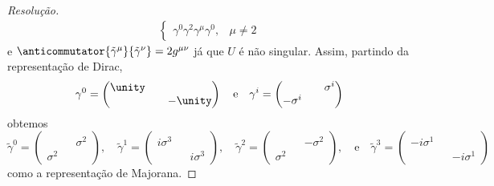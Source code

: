 \begin{proof}[Resolução]
\begin{align*}
\begin{cases}
                               \gamma^0 \gamma^2 \gamma^\mu\gamma^0,&\mu \neq 2
                           \end{cases}
    \end{align*}
    e \(\anticommutator{\tilde{\gamma}^\mu}{\tilde{\gamma}^\nu} = 2g^{\mu\nu}\) já que \(U\) é não singular. Assim, partindo da representação de Dirac,
    \begin{equation*}
        \gamma^0 = \begin{pmatrix}
            \unity &&\\
                   && -\unity
        \end{pmatrix}
        \quad\text{e}\quad
        \gamma^i = \begin{pmatrix}
            && \sigma^i\\
            -\sigma^i &&
        \end{pmatrix}
    \end{equation*}
    obtemos
    \begin{equation*}
        \tilde{\gamma}^0 
        = \begin{pmatrix}
            && \sigma^2\\
            \sigma^2 &&
        \end{pmatrix},\quad
        \tilde{\gamma}^1 
        = \begin{pmatrix}
            i \sigma^3 && \\
            && i \sigma^3
        \end{pmatrix},\quad
        \tilde{\gamma}^2
        = \begin{pmatrix}
            && -\sigma^2\\
            \sigma^2 &&
        \end{pmatrix},\quad\text{e}\quad
        \tilde{\gamma}^3 
        = \begin{pmatrix}
            -i \sigma^1 && \\
            && -i \sigma^1
        \end{pmatrix}
    \end{equation*}
    como a representação de Majorana.


\end{proof}
